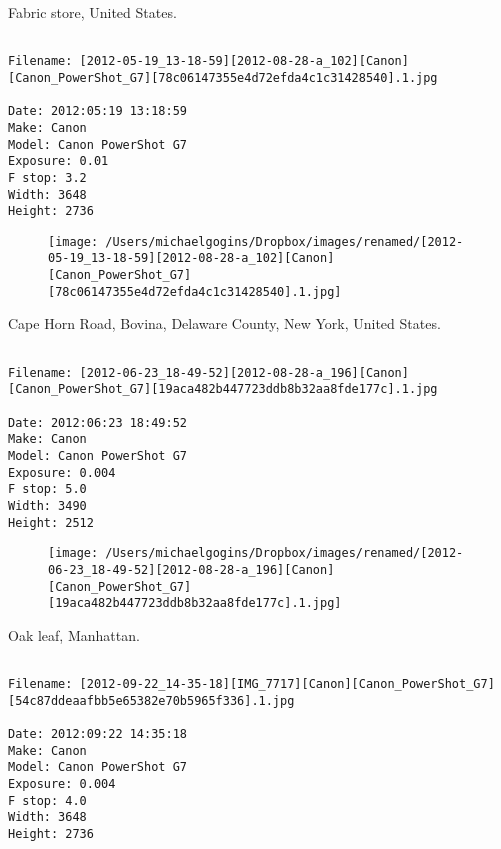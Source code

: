 \clearpage
\onecolumn
\noindent Fabric store, United States.
\noindent
\begin{lstlisting}

Filename: [2012-05-19_13-18-59][2012-08-28-a_102][Canon][Canon_PowerShot_G7][78c06147355e4d72efda4c1c31428540].1.jpg

Date: 2012:05:19 13:18:59
Make: Canon
Model: Canon PowerShot G7
Exposure: 0.01
F stop: 3.2
Width: 3648
Height: 2736
\end{lstlisting}
\clearpage

\begin{figure}
\texttt{[image: /Users/michaelgogins/Dropbox/images/renamed/[2012-05-19\_13-18-59][2012-08-28-a\_102][Canon][Canon\_PowerShot\_G7][78c06147355e4d72efda4c1c31428540].1.jpg]}
\end{figure}
    
\clearpage
\onecolumn
\noindent Cape Horn Road, Bovina, Delaware County, New York, United States.
\noindent
\begin{lstlisting}

Filename: [2012-06-23_18-49-52][2012-08-28-a_196][Canon][Canon_PowerShot_G7][19aca482b447723ddb8b32aa8fde177c].1.jpg

Date: 2012:06:23 18:49:52
Make: Canon
Model: Canon PowerShot G7
Exposure: 0.004
F stop: 5.0
Width: 3490
Height: 2512
\end{lstlisting}
\clearpage

\begin{figure}
\texttt{[image: /Users/michaelgogins/Dropbox/images/renamed/[2012-06-23\_18-49-52][2012-08-28-a\_196][Canon][Canon\_PowerShot\_G7][19aca482b447723ddb8b32aa8fde177c].1.jpg]}
\end{figure}
    
\clearpage
\onecolumn
\noindent Oak leaf, Manhattan.
\noindent
\begin{lstlisting}

Filename: [2012-09-22_14-35-18][IMG_7717][Canon][Canon_PowerShot_G7][54c87ddeaafbb5e65382e70b5965f336].1.jpg

Date: 2012:09:22 14:35:18
Make: Canon
Model: Canon PowerShot G7
Exposure: 0.004
F stop: 4.0
Width: 3648
Height: 2736
\end{lstlisting}
\clearpage

